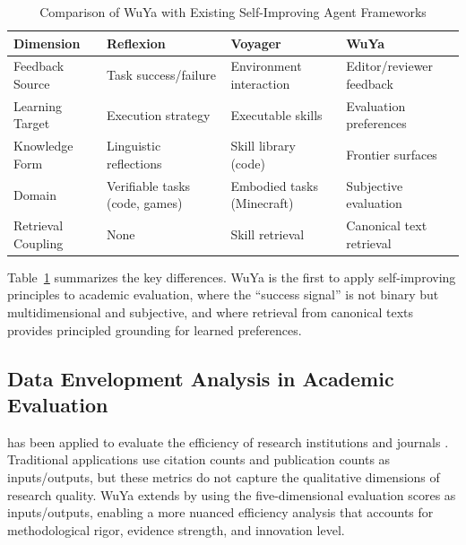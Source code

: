\begin{table}[t]
\centering
\caption{Comparison of WuYa with Existing Self-Improving Agent Frameworks}
\label{tab:self-improving-comparison}
\begin{tabular}{@{}llll@{}}
\toprule
\textbf{Dimension} & \textbf{Reflexion} & \textbf{Voyager} & \textbf{WuYa} \\
\midrule
Feedback Source & Task success/failure & Environment interaction & Editor/reviewer feedback \\
Learning Target & Execution strategy & Executable skills & Evaluation preferences \\
Knowledge Form & Linguistic reflections & Skill library (code) & Frontier surfaces \\
Domain & Verifiable tasks (code, games) & Embodied tasks (Minecraft) & Subjective evaluation \\
Retrieval Coupling & None & Skill retrieval & Canonical text retrieval \\
\bottomrule
\end{tabular}
\end{table}

Table~\ref{tab:self-improving-comparison} summarizes the key differences. WuYa is the first to apply self-improving principles to academic evaluation, where the ``success signal'' is not binary but multidimensional and subjective, and where retrieval from canonical texts provides principled grounding for learned preferences.

\subsection{Data Envelopment Analysis in Academic Evaluation}

\dea{} has been applied to evaluate the efficiency of research institutions and journals \citep{charnes1978measuring}. Traditional \dea{} applications use citation counts and publication counts as inputs/outputs, but these metrics do not capture the qualitative dimensions of research quality. WuYa extends \dea{} by using the five-dimensional evaluation scores as inputs/outputs, enabling a more nuanced efficiency analysis that accounts for methodological rigor, evidence strength, and innovation level.
